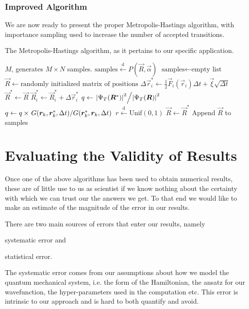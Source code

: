 \documentclass[twocolumn]{article}
\newcommand{\setfrom}{\overset{\mathrm{d}}{\leftarrow}}
\begin{document}
\subsubsection{Improved Algorithm}
We are now ready to present the proper Metropolis-Hastings algorithm, with
importance sampling used to increase the number of accepted transitions.

\begin{algorithm}[H]
    \caption{The Metropolis-Hastings algorithm, as it
    pertains to our specific application.}
    \label{alg:metropolis-importance}
    \begin{algorithmic}[1]
        \REQUIRE $M$, generates $M\times N$ samples.
        \ENSURE $\text{samples} \setfrom P(\vec R, \vec\alpha)$
        \STATE $\text{samples} \leftarrow \text{empty list}$
        \STATE $\vec R \leftarrow \text{randomly initialized matrix of positions}$
                \STATE $\Delta\vec r_i^* \leftarrow \frac{1}{2}\vec
                F_i(\vec r_i)\Delta t + \vec \xi\sqrt{\Delta t}$
                \STATE $\vec R^*\leftarrow \vec R $
                \STATE $\vec R^*_i \leftarrow \vec R^{*}_i+ \Delta \vec r_i^*$ 
                \STATE $q \leftarrow \flatfrac{\abs{\Psi_T(\vec R^*)}^2}{\abs{\Psi_T(\vec R)}^2}$
                \STATE $q \leftarrow q \times \flatfrac{G(\vec r_k, \vec r_k^*,
                    \Delta t)}{G(\vec r_k^*, \vec r_k, \Delta t)}$
                \STATE $r \setfrom \text{Unif}(0, 1)$
                    \STATE $\vec R \leftarrow \vec R^*$
                \ENDIF
                \STATE Append $\vec R$ to samples
            \ENDFOR
        \ENDFOR
    \end{algorithmic}
\end{algorithm}


\section{Evaluating the Validity of Results}
\label{sec:statistical-analisys}

Once one of the above algorithms has been used to obtain numerical results,
these are of little use to us as scientist if we know nothing about the
certainty with which we can trust our the answers we get. To that end we would
like to make an estimate of the magnitude of the error in our results.

There are two main sources of errors that enter our results, namely 
\begin{inparaenum}[1)]
    \item systematic error and
    \item statistical error.
\end{inparaenum}
The systematic error comes from our assumptions about how we model the quantum
mechanical system, i.e. the form of the Hamiltonian, the ansatz for our
wavefunction, the hyper-parameters used in the computation etc. This error is
intrinsic to our approach and is hard to both quantify and avoid.
\end{document}
